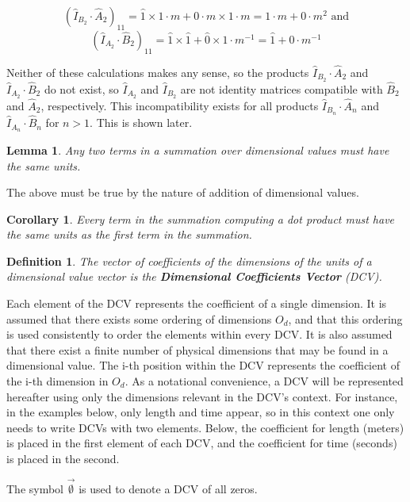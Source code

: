 \documentclass[10pt,letterpaper]{article}
\newtheorem{defn}{Definition}[section]
\newtheorem{lem}{Lemma}[section]
\newtheorem{cor}{Corollary}[section]
\numberwithin{equation}{section}
\begin{document}
\[ (\hat I_{B_2} \cdot \hat A_2)_{11} = \hat 1 \times 1 \cdot m + 0 \cdot m \times 1 \cdot m = 1 \cdot m + 0 \cdot m^2 \mbox{ and} \]
\[(\hat I_{A_2} \cdot \hat B_2)_{11} = \hat 1 \times \hat 1 + \hat 0 \times 1 \cdot m^{-1} = \hat 1 + 0 \cdot m^{-1} \]

Neither of these calculations makes any sense, so the products $\hat
I_{B_2} \cdot \hat A_2$ and $\hat I_{A_2} \cdot \hat B_2$ do not
exist, so $\hat I_{A_2}$ and $\hat I_{B_2}$ are not identity matrices
compatible with $\hat B_2$ and $\hat A_2$, respectively.  This
incompatibility exists for all products $\hat I_{B_n} \cdot \hat A_n$
and $\hat I_{A_n} \cdot \hat B_n$ for $n > 1$.  This is shown later.

\begin{lem} \label{terms_of_a_summation_have_equal_units} Any two
  terms in a summation over dimensional values must have the same
  units.\end{lem}

The above must be true by the nature of addition of dimensional values.

\begin{cor}Every term in the summation computing a dot product must
  have the same units as the first term in the summation.\end{cor}

\begin{defn}The vector of coefficients of the dimensions of the units
  of a dimensional value vector is the \textbf{Dimensional
    Coefficients Vector} (DCV).\end{defn}

Each element of the DCV represents the coefficient of a single
dimension.  It is assumed that there exists some ordering of
dimensions $O_d$, and that this ordering is used consistently to order
the elements within every DCV.  It is also assumed that there exist a
finite number of physical dimensions that may be found in a
dimensional value.  The i-th position within the DCV represents the
coefficient of the i-th dimension in $O_d$.  As a notational
convenience, a DCV will be represented hereafter using only the
dimensions relevant in the DCV's context.  For instance, in the
examples below, only length and time appear, so in this context one
only needs to write DCVs with two elements.  Below, the coefficient
for length (meters) is placed in the first element of each DCV, and
the coefficient for time (seconds) is placed in the second.

The symbol $\vec{\emptyset}$ is used to denote a DCV of all zeros.
\end{document}
